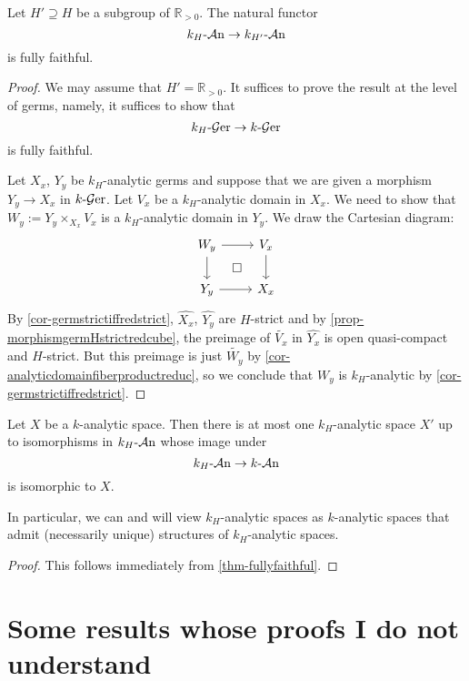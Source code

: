 \begin{thm}\label{thm-fullyfaithful}
    Let $H'\supseteq H$ be a subgroup of $\mathbb{R}_{>0}$. The natural functor
    \[
        k_H\text{-}\mathcal{A}\mathrm{n} \rightarrow k_{H'}\text{-}\mathcal{A}\mathrm{n}
    \]
    is fully faithful.
\end{thm}
\begin{proof}
    We may assume that $H'=\mathbb{R}_{>0}$. It suffices to prove the result at the level of germs, namely, it suffices to show that 
    \[
        k_H\text{-}\mathcal{G}\mathrm{er} \rightarrow k\text{-}\mathcal{G}\mathrm{er}
    \]
    is fully faithful.

    Let $X_x$, $Y_y$ be $k_H$-analytic germs and suppose that we are given a morphism $Y_y\rightarrow X_x$ in $k\text{-}\mathcal{G}\mathrm{er}$. Let $V_x$ be a $k_H$-analytic domain in $X_x$. We need to show that $W_y:=Y_y\times_{X_x} V_x$ is a $k_H$-analytic domain in $Y_y$. We draw the Cartesian diagram:
    \[
        \begin{tikzcd}
            W_y \arrow[d] \arrow[r] \arrow[rd, "\square", phantom] & V_x \arrow[d] \\
            Y_y \arrow[r]                                          & X_x          
        \end{tikzcd}  
    \]
    By \cref{cor-germstrictiffredstrict}, $\widehat{X_x}$, $\widehat{Y_y}$ are $H$-strict and by \cref{prop-morphismgermHstrictredcube}, the preimage of $\widetilde{V_x}$ in $\widehat{Y_x}$ is open quasi-compact and $H$-strict. But this preimage is just $\widetilde{W_y}$ by \cref{cor-analyticdomainfiberproductreduc}, so we conclude that $W_y$ is $k_H$-analytic by \cref{cor-germstrictiffredstrict}.
\end{proof}

\begin{corollary}
    Let $X$ be a $k$-analytic space. Then there is at most one $k_H$-analytic space $X'$ up to isomorphisms in $k_H\text{-}\mathcal{A}\mathrm{n}$ whose image under
    \[
        k_H\text{-}\mathcal{A}\mathrm{n} \rightarrow k\text{-}\mathcal{A}\mathrm{n}
    \] 
    is isomorphic to $X$. 
\end{corollary}
In particular, we can and will view $k_H$-analytic spaces as $k$-analytic spaces that admit (necessarily unique) structures of $k_H$-analytic spaces.
\begin{proof}
    This follows immediately from \cref{thm-fullyfaithful}. 
\end{proof}


\section{Some results whose proofs I do not understand}



